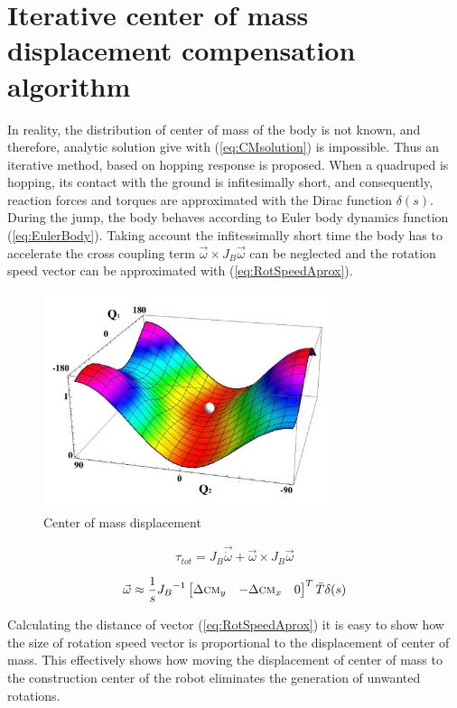 \section{Iterative center of mass displacement compensation algorithm}
In reality, the distribution of center of mass of the body is not known, and therefore, analytic solution give with (\ref{eq:CMsolution}) is impossible. Thus an iterative method, based on hopping response is proposed. When a quadruped is hopping, its contact with the ground is infitesimally short, and consequently, reaction forces and torques are approximated with the Dirac function $\delta (s)$. During the jump, the body behaves according to Euler body dynamics function (\ref{eq:EulerBody}). Taking account the infitessimally short time the body has to accelerate the cross coupling term $\vec{\omega}\times J_B\vec{\omega}$ can be neglected and the rotation speed vector can be approximated with (\ref{eq:RotSpeedAprox}).
\begin{figure}
	\centering
	\includegraphics[width=85mm]{./pictures/RobinRepicCM.pdf}
	\caption{Center of mass displacement}
	\label{fig:rmoment}
\end{figure}

\begin{equation}\label{eq:EulerBody}
\tau_{tot}=J_B\vec{\dot{\omega}}+\vec{\omega}\times J_B\vec{\omega}
\end{equation}

\begin{equation}\label{eq:RotSpeedAprox}
\vec{\omega}\approx \frac{1}{s}{J_B}^{-1}\begin{bmatrix}
\Delta \textsc{cm}_y & -\Delta \textsc{cm}_x & 0
\end{bmatrix}^T\bar{T}\delta(s)
\end{equation}

Calculating the distance of vector (\ref{eq:RotSpeedAprox}) it is easy to show how the size of rotation speed vector is proportional to the displacement of center of mass. This effectively shows how moving the displacement of center of mass to the construction center of the robot eliminates the generation of unwanted rotations. 

